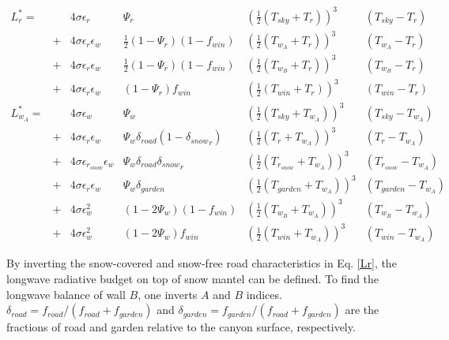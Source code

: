 \begin{equation}
\begin{array}{llllll}
L_{r}^* = && 4 \sigma \epsilon_{r} &\Psi_{r} &\left(\frac{1}{2}(T_{sky}+T_{r})\right)^3 & \left(T_{sky}-T_{r}\right) \nonumber \\
			       & + &  4 \sigma \epsilon_{r} \epsilon_{w} &\frac{1}{2}(1-\Psi_{r})(1-f_{win})&\left(\frac{1}{2}(T_{w_A}+T_{r})\right)^3 & \left(T_{w_A}-T_{r}\right) \\
			       & + &  4 \sigma \epsilon_{r} \epsilon_{w} &\frac{1}{2}(1-\Psi_{r})(1-f_{win})&\left(\frac{1}{2}(T_{w_B}+T_{r})\right)^3 & \left(T_{w_B}-T_{r}\right) \\
			       & + &  4 \sigma \epsilon_{r} \epsilon_{w} &(1-\Psi_{r})f_{win}&\left(\frac{1}{2}(T_{win}+T_{r})\right)^3 & \left(T_{win}-T_{r}\right) \label{Lr} \\
L_{w_A}^* = && 4 \sigma \epsilon_{w} &\Psi_{w} &\left(\frac{1}{2}(T_{sky}+T_{w_A})\right)^3& \left(T_{sky}-T_{w_A}\right) \nonumber \\
		   & + &  4 \sigma \epsilon_{r} \epsilon_{w} & \Psi_{w}\delta_{road}(1-{\delta_{snow}}_r)&\left(\frac{1}{2}(T_{r}+T_{w_A})\right)^3& \left(T_{r}-T_{w_A}\right) \nonumber \\
     & + &  4 \sigma \epsilon_{r_{snow}} \epsilon_{w} &\Psi_{w}\delta_{road}{\delta_{snow}}_r &\left(\frac{1}{2}(T_{r_{snow}}+T_{w_A})\right)^3& \left(T_{r_{snow}}-T_{w_A}\right) \nonumber \\
		   & + &  4 \sigma \epsilon_{r} \epsilon_{w} & \Psi_{w}\delta_{garden}&\left(\frac{1}{2}(T_{garden}+T_{w_A})\right)^3& \left(T_{garden}-T_{w_A}\right) \nonumber \\
     & + &  4 \sigma \epsilon_{w}^2 &(1-2 \Psi_{w})(1-f_{win})&\left(\frac{1}{2}(T_{w_B}+T_{w_A})\right)^3& \left(T_{w_{B}}-T_{w_A}\right) \\
     & + &  4 \sigma \epsilon_{w}^2 &(1-2 \Psi_{w})f_{win}&\left(\frac{1}{2}(T_{win}+T_{w_A})\right)^3& \left(T_{win}-T_{w_A}\right)
\end{array}
\end{equation}


By inverting the snow-covered and snow-free road characteristics in Eq. \ref{Lr}, the longwave radiative budget on top of snow mantel can be defined. To find the longwave balance of wall $B$, one inverts $A$ and $B$ indices. $\delta_{road}=f_{road}/(f_{road}+f_{garden})$ and $\delta_{garden}=f_{garden}/(f_{road}+f_{garden})$ are the fractions of road and garden relative to the canyon surface, respectively. \\

